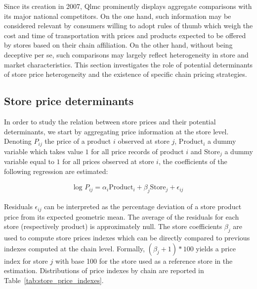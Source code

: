 \documentclass[english]{article}
\begin{document}
Since its creation in 2007, Qlmc prominently displays aggregate comparisons with its major national competitors. On the one hand, such information may be considered relevant by consumers willing to adopt rules of thumb which weigh the cost and time of transportation with prices and products expected to be offered by stores based on their chain affiliation. On the other hand, without being deceptive per se, such comparisons may largely reflect heterogeneity in store and market characteristics. This section investigates the role of potential determinants of store price heterogeneity and the existence of specific chain pricing strategies.

\subsection{Store price determinants}

In order to study the relation between store prices and their potential determinants, we start by aggregating price information at the store level. Denoting $P_{ij}$ the price of a product $i$ observed at store $j$, $\text{Product}_i$ a dummy variable which takes value $1$ for all price records of product $i$ and $\text{Store}_j$ a dummy variable equal to $1$ for all prices observed at store $i$, the coefficients of the following regression are estimated:

\begin{align}
\text{log }P_{ij} = \alpha_i \text{Product}_i + \beta_j \text{Store}_j + \epsilon_{ij}
\label{reg_product_prices}
\end{align}

Residuals $\epsilon_{ij}$ can be interpreted as the percentage deviation of a store product price from its expected geometric mean. The average of the residuals for each store (respectively product) is approximately null. The store coefficients $\beta_j$ are used to compute store prices indexes which can be directly compared to previous indexes computed at the chain level. Formally, $(\beta_j + 1) * 100$ yields a price index for store $j$ with base 100 for the store used as a reference store in the estimation. Distributions of price indexes by chain are reported in Table~\ref{tab:store_price_indexes}.
\end{document}
